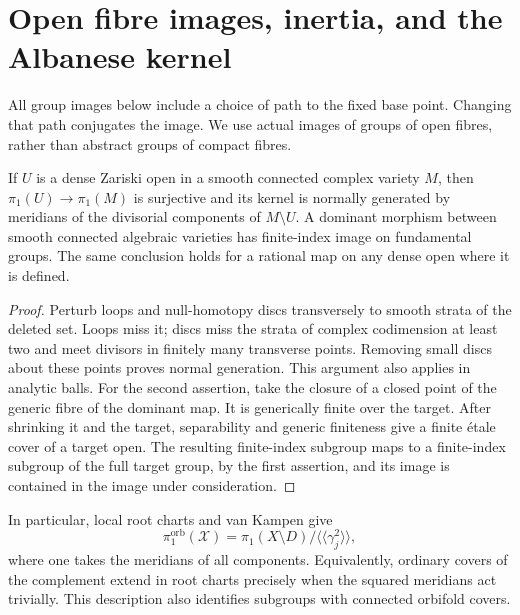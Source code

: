 \section{Open fibre images, inertia, and the Albanese kernel}
\label{in:inertia}

All group images below include a choice of path to the fixed base
point.  Changing that path conjugates the image.  We use actual
images of groups of open fibres, rather than abstract groups of
compact fibres.

\begin{lemma}\label{in:topology}
If \(U\) is a dense Zariski open in a smooth connected complex
variety \(M\), then \(\pi_1(U)\to\pi_1(M)\) is surjective and its
kernel is normally generated by meridians of the divisorial
components of \(M\setminus U\).  A dominant morphism between smooth
connected algebraic varieties has finite-index image on fundamental
groups.  The same conclusion holds for a rational map on any dense
open where it is defined.
\end{lemma}

\begin{proof}
Perturb loops and null-homotopy discs transversely to smooth strata
of the deleted set.  Loops miss it; discs miss the strata of complex
codimension at least two and meet divisors in finitely many
transverse points.  Removing small discs about these points proves
normal generation.  This argument also applies in analytic balls.
For the second assertion, take the closure of a closed point of the
generic fibre of the dominant map.  It is generically finite over
the target.  After shrinking it and the target, separability and
generic finiteness give a finite \'{e}tale cover of a target open.
The resulting finite-index subgroup maps to a finite-index subgroup
of the full target group, by the first assertion, and its image is
contained in the image under consideration.
\end{proof}

In particular, local root charts and van Kampen give
\begin{equation}\label{in:orbifold-presentation}
 \pi_1^{\mathrm{orb}}(\mathcal X)
 =\pi_1(X\setminus D)
     /\langle\!\langle\gamma_j^2\rangle\!\rangle,
\end{equation}
where one takes the meridians of all components.  Equivalently,
ordinary covers of the complement extend in root charts precisely
when the squared meridians act trivially.  This description also
identifies subgroups with connected orbifold covers.

